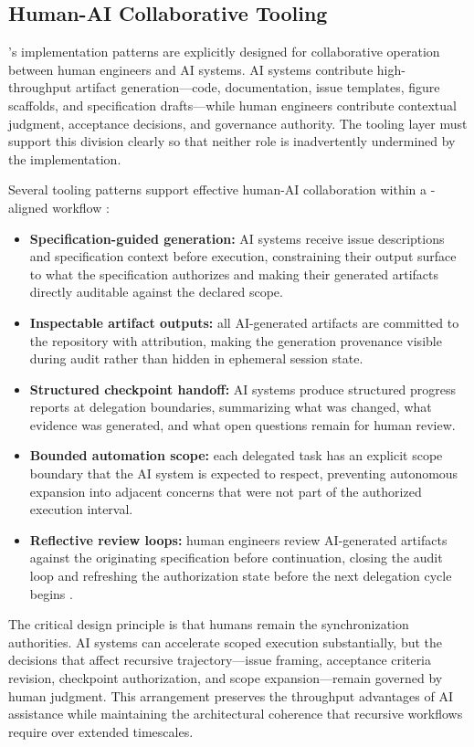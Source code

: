 \subsection{Human-AI Collaborative Tooling}

's implementation patterns are explicitly designed for collaborative operation between human engineers and AI systems. AI systems contribute high-throughput artifact generation---code, documentation, issue templates, figure scaffolds, and specification drafts---while human engineers contribute contextual judgment, acceptance decisions, and governance authority. The tooling layer must support this division clearly so that neither role is inadvertently undermined by the implementation.

Several tooling patterns support effective human-AI collaboration within a -aligned workflow \cite{Amershi2014InteractiveML,Shneiderman2020HCAI}:
\begin{itemize}
  \item \textbf{Specification-guided generation:} AI systems receive issue descriptions and specification context before execution, constraining their output surface to what the specification authorizes and making their generated artifacts directly auditable against the declared scope.
  \item \textbf{Inspectable artifact outputs:} all AI-generated artifacts are committed to the repository with attribution, making the generation provenance visible during audit rather than hidden in ephemeral session state.
  \item \textbf{Structured checkpoint handoff:} AI systems produce structured progress reports at delegation boundaries, summarizing what was changed, what evidence was generated, and what open questions remain for human review.
  \item \textbf{Bounded automation scope:} each delegated task has an explicit scope boundary that the AI system is expected to respect, preventing autonomous expansion into adjacent concerns that were not part of the authorized execution interval.
  \item \textbf{Reflective review loops:} human engineers review AI-generated artifacts against the originating specification before continuation, closing the audit loop and refreshing the authorization state before the next delegation cycle begins \cite{Sweller1988CognitiveLoad,Hutchins1995CognitionWild}.
\end{itemize}

The critical design principle is that humans remain the synchronization authorities. AI systems can accelerate scoped execution substantially, but the decisions that affect recursive trajectory---issue framing, acceptance criteria revision, checkpoint authorization, and scope expansion---remain governed by human judgment. This arrangement preserves the throughput advantages of AI assistance while maintaining the architectural coherence that recursive workflows require over extended timescales.

